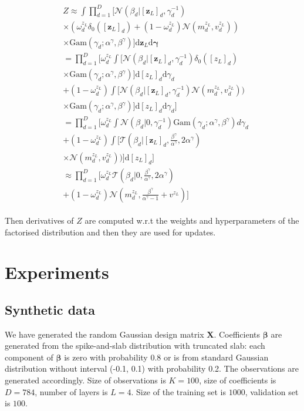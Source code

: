 \documentclass[letterpaper]{article}
\begin{document}
\begin{align}
\begin{split}
&Z \approx \int \prod_{d=1}^{D} \big[\mathcal{N}(\beta_d | [\mathbf{z}_L]_d, \gamma_d^{-1}) \\
&\times (\omega^{z_L}_d \delta_0([\mathbf{z}_L]_d) + (1 - \omega^{z_L}_d)\mathcal{N}(m^{z_L}_d, v^{z_L}_d))\\
&\times \text{Gam} (\gamma_d; \alpha^\gamma, \beta^\gamma)\big]\mathrm{d}\mathbf{z}_L \mathrm{d}\boldsymbol\gamma \\
&= \prod_{d=1}^{D} \Big[\omega^{z_L}_d \int \big[\mathcal{N}(\beta_d | [\mathbf{z}_L]_d, \gamma_d^{-1})  \delta_0([z_L]_d) \\
&\times \text{Gam} (\gamma_d; \alpha^\gamma, \beta^\gamma)\big]\mathrm{d}[{z}_L]_d \mathrm{d}\gamma_d \\
& + (1 - \omega^{z_L}_d)\int \big[\mathcal{N}(\beta_d | [\mathbf{z}_L]_d, \gamma_d^{-1})\mathcal{N}(m^{z_L}_d, v^{z_L}_d)) \\
&\times \text{Gam} (\gamma_d; \alpha^\gamma, \beta^\gamma)\big]\mathrm{d}[{z}_L]_d \mathrm{d}\gamma_d\Big] \\
& = \prod_{d=1}^{D} \Big[\omega^{z_L}_d \int \mathcal{N}(\beta_d | 0, \gamma_d^{-1})  \text{Gam} (\gamma_d; \alpha^\gamma, \beta^\gamma) d\gamma_d \\
& + (1 - \omega^{z_L}_d)\int \big[\mathcal{T}(\beta_d | [\mathbf{z}_L]_d, \frac{\beta^\gamma}{\alpha^\gamma}, 2\alpha^\gamma) \\
&\times \mathcal{N}(m^{z_L}_d, v^{z_L}_d))\big] \mathrm{d}[{z}_L]_d\Big] \\
& \approx \prod_{d=1}^D \Big[\omega^{z_L}_d  \mathcal{T}(\beta_d | 0, \frac{\beta^\gamma}{\alpha^\gamma}, 2\alpha^\gamma) \\
&+ (1 - \omega^{z_L}_d)\mathcal{N}(m^{z_L}_d, \frac{\beta^\gamma}{\alpha^\gamma - 1} + v^{z_L})\Big]
\end{split}
\end{align}

Then derivatives of $Z$ are computed w.r.t the weights and hyperparameters of the factorised distribution and then they are used for updates.

\section{Experiments}
\subsection{Synthetic data}
We have generated the random Gaussian design matrix $\mathbf{X}$. Coefficients $\boldsymbol\beta$ are generated from the spike-and-slab distribution with truncated slab: each component of $\boldsymbol\beta$ is zero with probability 0.8 or is from standard Gaussian distribution without interval (-0.1, 0.1) with probability 0.2. The observations are generated accordingly. Size of observations is $K=100$, size of coefficients is $D=784$, number of layers is $L=4$. Size of the training set is $1000$, validation set is $100$. 
\end{document}
